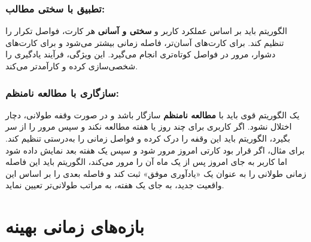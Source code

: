 \documentclass[12pt]{report}
\begin{document}
\subsubsection{تطبیق با سختی مطالب:} الگوریتم باید بر اساس عملکرد کاربر و \textbf{سختی و آسانی} هر کارت، فواصل تکرار را تنظیم کند. برای کارت‌های آسان‌تر، فاصله زمانی بیشتر می‌شود و برای کارت‌های دشوار، مرور در فواصل کوتاه‌تری انجام می‌گیرد. این ویژگی، فرآیند یادگیری را شخصی‌سازی کرده و کارآمدتر می‌کند.

\subsubsection{سازگاری با مطالعه نامنظم:} یک الگوریتم قوی باید با \textbf{مطالعه نامنظم} سازگار باشد و در صورت وقفه طولانی، دچار اختلال نشود. اگر کاربری برای چند روز یا هفته مطالعه نکند و سپس مرور را از سر بگیرد، الگوریتم باید این وقفه را درک کرده و فواصل زمانی را به‌درستی تنظیم کند. برای مثال، اگر قرار بود کارتی امروز مرور شود و سپس یک هفته بعد نمایش داده شود اما کاربر به جای امروز پس از یک ماه آن را مرور می‌کند، الگوریتم باید این فاصله زمانی طولانی را به عنوان یک  «یادآوری موفق» ثبت کند و فاصله بعدی را بر اساس این واقعیت جدید، به جای یک هفته، به مراتب طولانی‌تر تعیین نماید.

\section{بازه‌های زمانی بهینه}



\end{document}
